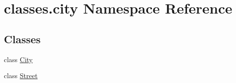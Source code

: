 \hypertarget{namespaceclasses_1_1city}{}\section{classes.\+city Namespace Reference}
\label{namespaceclasses_1_1city}
\subsection*{Classes}
\begin{DoxyCompactItemize}
\item 
class \hyperlink{classclasses_1_1city_1_1City}{City}
\item 
class \hyperlink{classclasses_1_1city_1_1Street}{Street}
\end{DoxyCompactItemize}
